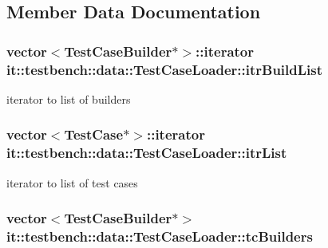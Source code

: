\subsection{Member Data Documentation}
\hypertarget{classit_1_1testbench_1_1data_1_1TestCaseLoader_a8cb21b96baa5bc91fd0c9a8051aacddf}{
\subsubsection[{itr\-Build\-List}]{\setlength{\rightskip}{0pt plus 5cm}vector$<${\bf Test\-Case\-Builder}$\ast$$>$\-::iterator it\-::testbench\-::data\-::\-Test\-Case\-Loader\-::itr\-Build\-List\hspace{0.3cm}{\ttfamily [private]}}}\label{df/dca/classit_1_1testbench_1_1data_1_1TestCaseLoader_a8cb21b96baa5bc91fd0c9a8051aacddf}
iterator to list of builders \hypertarget{classit_1_1testbench_1_1data_1_1TestCaseLoader_afcf0ab648278bdb692a1dbc603d630a0}{
\subsubsection[{itr\-List}]{\setlength{\rightskip}{0pt plus 5cm}vector$<${\bf Test\-Case}$\ast$$>$\-::iterator it\-::testbench\-::data\-::\-Test\-Case\-Loader\-::itr\-List\hspace{0.3cm}{\ttfamily [private]}}}\label{df/dca/classit_1_1testbench_1_1data_1_1TestCaseLoader_afcf0ab648278bdb692a1dbc603d630a0}
iterator to list of test cases \hypertarget{classit_1_1testbench_1_1data_1_1TestCaseLoader_a43d17d71e6a0b38d053fb48f3cd4219e}{
\subsubsection[{tc\-Builders}]{\setlength{\rightskip}{0pt plus 5cm}vector$<${\bf Test\-Case\-Builder}$\ast$$>$ it\-::testbench\-::data\-::\-Test\-Case\-Loader\-::tc\-Builders\hspace{0.3cm}{\ttfamily [private]}}}\label{df/dca/classit_1_1testbench_1_1data_1_1TestCaseLoader_a43d17d71e6a0b38d053fb48f3cd4219e}

